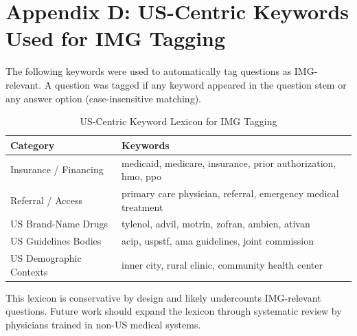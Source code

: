 \section{Appendix D: US-Centric Keywords Used for IMG Tagging}

The following keywords were used to automatically tag questions as IMG-relevant. A question was tagged if any keyword appeared in the question stem or any answer option (case-insensitive matching).

\begin{table}[htbp]
\centering
\caption{US-Centric Keyword Lexicon for IMG Tagging}
\label{tab:img_keywords}
\begin{tabular}{ll}
\toprule
Category & Keywords \\
\midrule
Insurance / Financing & medicaid, medicare, insurance, prior authorization, hmo, ppo \\
Referral / Access & primary care physician, referral, emergency medical treatment \\
US Brand-Name Drugs & tylenol, advil, motrin, zofran, ambien, ativan \\
US Guidelines Bodies & acip, uspstf, ama guidelines, joint commission \\
US Demographic Contexts & inner city, rural clinic, community health center \\
\bottomrule
\end{tabular}
\end{table}

This lexicon is conservative by design and likely undercounts IMG-relevant questions. Future work should expand the lexicon through systematic review by physicians trained in non-US medical systems.

